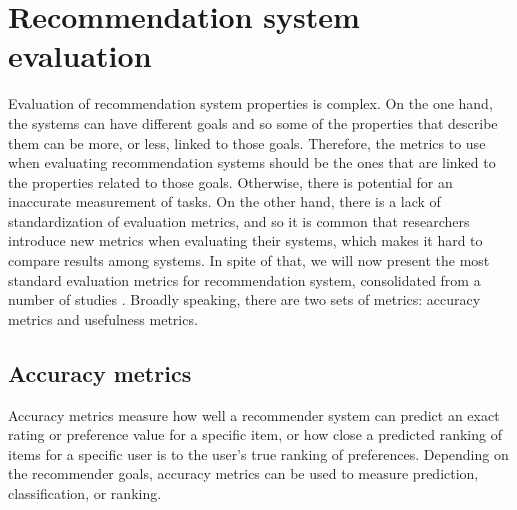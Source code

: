 \section{Recommendation system evaluation}\label{sec:ch4-evaluation}
Evaluation of recommendation system properties is complex. 
On the one hand, the systems can have different goals and so some of the properties that describe them can be more, or less, linked to those goals. Therefore, the metrics to use when evaluating recommendation systems should be the ones that are linked to the properties related to those goals. Otherwise, there is potential for an inaccurate measurement of tasks. 
On the other hand, there is a lack of standardization of evaluation metrics, and so it is common that researchers introduce new metrics when evaluating their systems, which makes it hard to compare results among systems. 
In spite of that, we will now present the most standard evaluation metrics for recommendation system, consolidated from a number of studies \autocite{goldberg01eigentaste, herlocker04evaluating, su09survey, celma10music, shani11evaluating, lu12recommender}. 
Broadly speaking, there are two sets of metrics: accuracy metrics and usefulness metrics.

\subsection{Accuracy metrics}
Accuracy metrics measure how well a recommender system can predict an exact rating or preference value for a specific item, or how close a predicted ranking of items for a specific user is to the user's true ranking of preferences. 
Depending on the recommender goals, accuracy metrics can be used to measure prediction, classification, or ranking.
	

